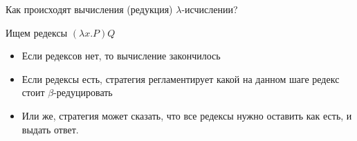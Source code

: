 \begin{frame}{Как происходят вычисления (редукция) $\lambda$-исчислении?}
  \begin{definition}
    Ищем редексы $(\lambda x. P)Q$
    \begin{itemize}
      \item Если редексов нет, то вычисление закончилось
      \item Если редексы есть, стратегия регламентирует какой на данном шаге редекс стоит $\beta$-редуцировать
      \item Или же, стратегия может сказать, что все редексы нужно оставить как есть, и выдать ответ.
    \end{itemize}
  \end{definition}
\end{frame}

